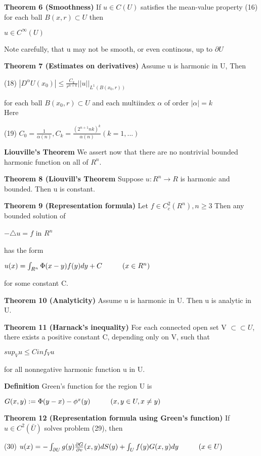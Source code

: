 \documentclass{article}
\newcommand\tab[1][1cm]{\hspace*{#1}}
\begin{document}
\textbf {Theorem 6 (Smoothness)} If $u \in C(U)$ satisfies the mean-value property (16) for each ball $B(x,r) \subset U$ then
\begin{center}
$u \in C^{\infty} (U)$
\end{center}
Note carefully, that u may not be smooth, or even continous, up to $\partial U$

\textbf {Theorem 7 (Estimates on derivatives)} Assume u is harmonic in U, Then 
\begin{center}
(18) $|D^{\alpha} U(x_0)| \leq \frac{C_k}{r^{n+k}}||u||_{L^{1}(B(x_0, r))}$
\end{center}
for each ball $B(x_0, r) \subset U$ and each multiindex $\alpha$ of order $|\alpha| = k$ \\
Here
\begin{center}
(19) $C_0 = \frac{1}{\alpha(n)}, C_k = \frac{(2^{n+1}nk)^k}{\alpha(n) } (k=1,...)$
\end{center}

\textbf {Liouville's Theorem} We assert now that there are no nontrivial bounded harmonic function on all of $R^n$.

\textbf {Theorem 8 (Liouvill's Theorem} Suppose $u:R^n \to R$ is harmonic and bounded. Then u is constant.

\textbf {Theorem 9 (Representation formula)} Let $f \in C^2_c(R^n), n \geq 3$ Then any bounded solution of 
\begin{center}
$-\triangle u = f$ \tab in $R^n$
\end{center} 
has the form
\begin{center}
$u(x) = \int_{R^n} \Phi(x-y)f(y) dy + C \tab (x \in R^n)$
\end{center}
for some constant C.

\textbf {Theorem 10 (Analyticity)} Assume u is harmonic in U. Then u is analytic in U.

\textbf {Theorem 11 (Harnack's inequality)} For each connected open set V $\subset \subset U$, there exists a positive constant C, depending only on V, such that
\begin{center}
$sup_V u \leq C inf_V u$
\end{center}
for all nonnegative harmonic function u in U.

\textbf {Definition} Green's function for the region U is 
\begin{center}
$G(x,y) := \Phi(y-x) - \phi^x(y) \tab (x,y \in U, x \neq y)$
\end{center}

\textbf {Theorem 12 (Representation formula using Green's function)} If $u \in C^2(\bar{U})$ solves problem (29), then
\begin{center}
(30) \tab $u(x) = -\int_{\partial U} g(y) \frac{\partial G}{\partial v} (x,y) dS(y) + \int_U f(y)G(x,y) dy \tab (x \in U)$ 
\end{center}
\end{document}
